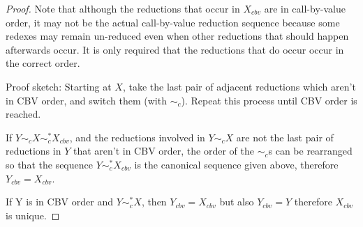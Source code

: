 \documentclass{article}
\theoremstyle{definition}
\theoremstyle{lemma}
\theoremstyle{remark}
\begin{document}

\begin{proof}
Note that although the reductions that occur in $X_{cbv}$ are in call-by-value order, it may not be the actual call-by-value reduction sequence because some redexes may remain un-reduced even when other reductions that should happen afterwards occur. It is only required that the reductions that do occur occur in the correct order.

Proof sketch:
Starting at $X$, take the last pair of adjacent reductions which aren't in CBV order, and switch them (with $\sim_c$). Repeat this process until CBV order is reached.

If $Y \sim_c X \sim_c^* X_{cbv}$, and the reductions involved in $Y \sim_c X$ are not the last pair of reductions in $Y$ that aren't in CBV order, the order of the $\sim_c$s can be rearranged so that the sequence $Y \sim_c^* X_{cbv}$ is the canonical sequence given above, therefore $Y_{cbv} = X_{cbv}$.

If Y is in CBV order and $Y \sim_c^* X$, then $Y_{cbv} = X_{cbv}$ but also $Y_{cbv} = Y$ therefore $X_{cbv}$ is unique.
\end{proof}
\end{document}
